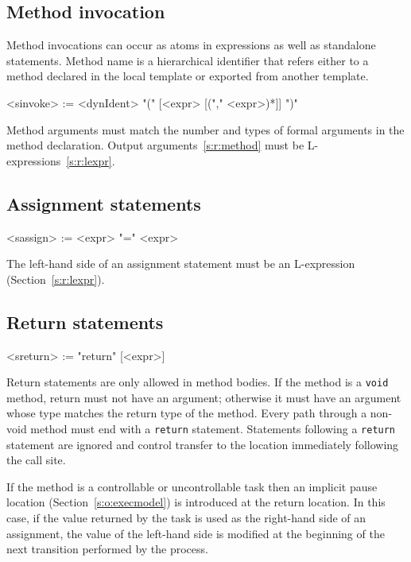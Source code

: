 \documentclass{report}
\newcommand{\src}[1]{\texttt{#1}}
\begin{document}
\subsection{Method invocation}\label{s:r:invocation}

Method invocations can occur as atoms in expressions as well as 
standalone statements.  Method name is a hierarchical identifier 
that refers either to a method declared in the local template or 
exported from another template.
\begin{bnflisting}{}
<sinvoke> := <dynIdent> "(" [<expr> [("," <expr>)*]] ")"
\end{bnflisting}
Method arguments must match the number and types of formal 
arguments in the method declaration.  Output 
arguments~\ref{s:r:method} must be L-expressions~\ref{s:r:lexpr}.

\subsection{Assignment statements}

\begin{bnflisting}{}
<sassign> := <expr> "=" <expr>
\end{bnflisting}

The left-hand side of an assignment statement must be an 
L-expression (Section~\ref{s:r:lexpr}).  

\subsection{Return statements}\label{s:r:return}

\begin{bnflisting}{}
<sreturn> := "return" [<expr>]
\end{bnflisting}

Return statements are only allowed in method bodies.  If the 
method is a \src{void} method, return must not have an argument; 
otherwise it must have an argument whose type matches the return 
type of the method.  Every path through a non-void method must end 
with a \src{return} statement.  Statements following a 
\src{return} statement are ignored and control transfer to the 
location immediately following the call site.  

If the method is a controllable or uncontrollable task then an 
implicit pause location (Section~\ref{s:o:execmodel}) is 
introduced at the return location.  In this case, if the value 
returned by the task is used as the right-hand side of an 
assignment, the value of the left-hand side is modified at the 
beginning of the next transition performed by the process.
\end{document}
